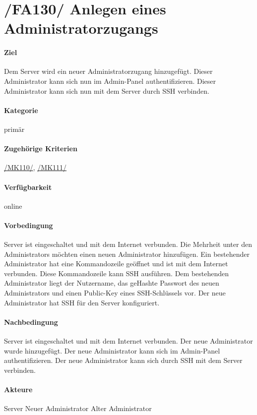 \section[Anlegen eines Administratorzugangs]{/FA130/ Anlegen eines Administratorzugangs}
\label{/FA130/}
\paragraph{Ziel}
Dem \Gls{Server} wird ein neuer \Gls{Administrator}zugang hinzugefügt.
Dieser Administrator kann sich nun im \Gls{Admin-Panel} authentifizieren.
Dieser Administrator kann sich nun mit dem \Gls{Server} durch \Gls{SSH} verbinden.
\paragraph{Kategorie}
primär
\paragraph{Zugehörige Kriterien}
\hyperref[/MK110/]{/MK110/}, \hyperref[/MK111/]{/MK111/}
\paragraph{Verfügbarkeit}
online
\paragraph{Vorbedingung}
\Gls{Server} ist eingeschaltet und mit dem Internet verbunden.
Die Mehrheit unter den \Glspl{Administrator} möchten einen neuen Administrator hinzufügen.
Ein bestehender \Gls{Administrator} hat eine \Gls{Kommandozeile} geöffnet und ist mit dem Internet verbunden.
Diese \Gls{Kommandozeile} kann \Gls{SSH} ausführen.
Dem bestehenden \Gls{Administrator} liegt der Nutzername, das ge\gls{Hash}te Passwort des neuen Administrators und einen \Gls{Public-Key} eines \Gls{SSH}-Schlüssels vor.
Der neue \Gls{Administrator} hat \Gls{SSH} für den \Gls{Server} konfiguriert.
\paragraph{Nachbedingung}
\Gls{Server} ist eingeschaltet und mit dem Internet verbunden.
Der neue \Gls{Administrator} wurde hinzugefügt.
Der neue \Gls{Administrator} kann sich im \Gls{Admin-Panel} authentifizieren.
Der neue \Gls{Administrator} kann sich durch \Gls{SSH} mit dem Server verbinden.
\paragraph{Akteure}
\Gls{Server}
Neuer \Gls{Administrator}
Alter \Gls{Administrator}
